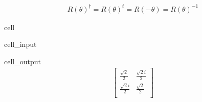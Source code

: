\documentclass[letterpaper,10pt,english]{jupyterBook}
\begin{document}
\begin{equation*}
\begin{split} R(\theta)^\dagger =R(\theta)^t = R(-\theta) = R(\theta)^{-1}\end{split}
\end{equation*}
\begin{sphinxuseclass}{cell}\begin{sphinxVerbatimInput}

\begin{sphinxuseclass}{cell_input}
\begin{sphinxVerbatim}[commandchars=\\\{\}]
\PYG{p}{[}\PYG{p}{[}\PYG{p}{]}\PYG{p}{[}  \PYG{p}{]}\PYG{p}{]}
\end{sphinxVerbatim}

\end{sphinxuseclass}\end{sphinxVerbatimInput}
\begin{sphinxVerbatimOutput}

\begin{sphinxuseclass}{cell_output}\begin{equation*}
\begin{split}\begin{bmatrix}
\frac{\sqrt{2}}{2} & \frac{\sqrt{2} i}{2}  \\
 \frac{\sqrt{2} i}{2} & \frac{\sqrt{2}}{2}  \\
 \end{bmatrix}
\end{split}
\end{equation*}
\end{sphinxuseclass}\end{sphinxVerbatimOutput}

\end{sphinxuseclass}
\end{document}
